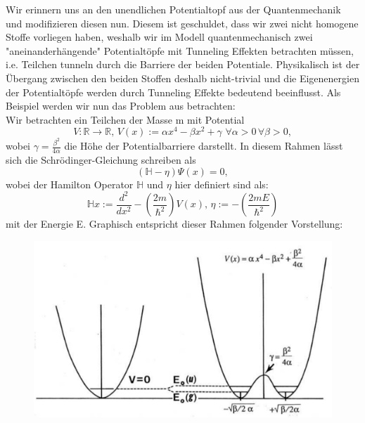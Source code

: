 Wir erinnern uns an den unendlichen Potentialtopf aus der Quantenmechanik und modifizieren diesen nun. Diesem ist geschuldet, dass wir zwei nicht homogene Stoffe vorliegen haben, weshalb wir im Modell quantenmechanisch zwei "aneinanderhängende" Potentialtöpfe mit Tunneling Effekten betrachten müssen, i.e. Teilchen tunneln durch die Barriere der beiden Potentiale. Physikalisch ist der Übergang zwischen den beiden Stoffen deshalb nicht-trivial und die Eigenenergien der Potentialtöpfe werden durch Tunneling Effekte bedeutend beeinflusst. Als Beispiel werden wir nun das Problem aus \cite{DoubleWellBerdecia} betrachten:\\
Wir betrachten ein Teilchen der Masse m mit Potential
\begin{equation}
    V : \mathbb{R} \to \mathbb{R}, \, V(x) := \alpha x^4 - \beta x^2 + \gamma \, \, \forall \alpha > 0 \, \forall \beta > 0,
\end{equation}
wobei \(\gamma = \frac{\beta^2}{4 \alpha}\) die Höhe der Potentialbarriere darstellt. In diesem Rahmen lässt sich die Schrödinger-Gleichung schreiben als
\begin{equation}
    (\mathbb{H} - \eta) \Psi(x) = 0,
\end{equation}
wobei der Hamilton Operator \(\mathbb{H}\) und \(\eta\) hier definiert sind als:
\begin{equation}
    \mathbb{H}x := \frac{d^2}{dx^2} - (\frac{2m}{\hbar^2})V(x), \, \eta := -(\frac{2mE}{\hbar^2})
\end{equation}
mit der Energie E. Graphisch entspricht dieser Rahmen folgender Vorstellung:
\begin{figure}[label={fig:dwp}, caption={Ein Beispiel für einen eindimensionalen Doppelpotentialtopf in symmetrischer Form \cite{DoubleWellBerdecia}}]
    \includegraphics[scale=0.5]{figures/DoubleWellPot.pdf}
\end{figure}

